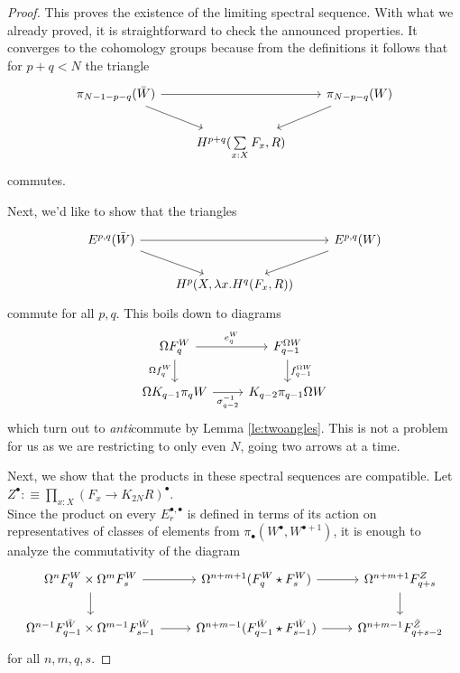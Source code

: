 \documentclass{amsart}
\theoremstyle{definition}
\newcommand{\tot}[2]{\sum\limits_{#1}^{}{#2}}
\newcommand{\depfun}[2]{\prod\limits_{#1}^{}{#2}}
\begin{document}
\begin{proof}
    This proves the existence of the limiting spectral sequence. With what we already proved, it is straightforward to check the announced properties. It converges to the cohomology groups because from the definitions it follows that for $p+q<N$ the triangle
    \[
    \begin{tikzcd}
    	{\pi_{N-1-p-q}(\bar{W})} && {\pi_{N-p-q}(W)} \\
    	& {H^{p+q}(\tot{x:X}{F_x}, R)}
    	\arrow[from=1-1, to=1-3]
    	\arrow[from=1-1, to=2-2]
    	\arrow[from=1-3, to=2-2]
    \end{tikzcd}
    \]
    commutes.

    Next, we'd like to show that the triangles
    \[\begin{tikzcd}
    	{E^{p,q}(\bar{W})} && {E^{p,q}({W})} \\
    	& {H^{p}(X, \lambda x.H^q(F_x, R))}
    	\arrow[from=1-1, to=1-3]
    	\arrow[from=1-1, to=2-2]
    	\arrow[from=1-3, to=2-2]
    \end{tikzcd}\]
    commute for all $p,q$. This boils down to diagrams
    \[\begin{tikzcd}
    	{\Omega F_q^W} & {F_{q-1}^{\Omega W}} \\
    	{\Omega K_{q-1} \pi_{q}W} & {K_{q-2}\pi_{q-1}\Omega W}
    	\arrow["{e_q^W}", from=1-1, to=1-2]
    	\arrow["{\Omega f^W_q}"', from=1-1, to=2-1]
    	\arrow["{f^{\Omega W}_{q-1}}", from=1-2, to=2-2]
    	\arrow["{\sigma^{-1}_{q-2}}"', from=2-1, to=2-2]
    \end{tikzcd}\]
    which turn out to \textit{anti}commute by Lemma \ref{le:twoangles}. This is not a problem for us as we are restricting to only even $N$, going two arrows at a time.

    Next, we show that the products in these spectral sequences are compatible. Let $Z^{\bullet} : \equiv \depfun{x:X}{(F_x \to K_{2N}R)^{\bullet}}$.
    \\
    Since the product on every $E_r^{\bullet, \bullet}$ is defined in terms of its action on representatives of classes of elements from $\pi_\bullet({W^{\bullet}, W^{\bullet+1}})$, it is enough to analyze the commutativity of the diagram
    \[\begin{tikzcd}
    	{\Omega^n F_q^W \times \Omega^m F_s^W} & {\Omega^{n+m+1}(F^W_q \star F_s^W)} & {\Omega^{n+m+1}F^Z_{q+s}} \\
    	{\Omega^{n-1} F^{\bar{W}}_{q-1} \times \Omega^{m-1} {F}^{\bar{W}}_{s-1}} & {\Omega^{n+m-1}({F}^{\bar{W}}_{q-1} \star {F}_{s-1}^{\bar{W}})} & {\Omega^{n+m-1}{F}^{\bar{Z}}_{q+s-2}}
    	\arrow[from=1-1, to=1-2]
    	\arrow[from=1-1, to=2-1]
    	\arrow[from=1-2, to=1-3]
    	\arrow[from=1-3, to=2-3]
    	\arrow[from=2-1, to=2-2]
    	\arrow[from=2-2, to=2-3]
    \end{tikzcd}\]
    for all $n,m,q,s$.



\end{proof}
\end{document}
